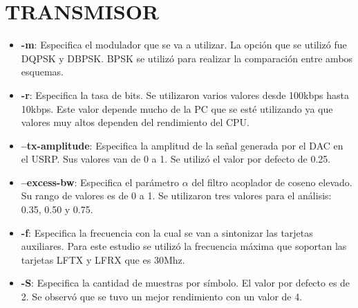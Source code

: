 \section*{TRANSMISOR}
\begin{itemize}
  \item \textbf{-m}: Especifica el modulador que se va a utilizar. La opci\'on que se utiliz\'o fue
  DQPSK y DBPSK. BPSK se utiliz\'o para realizar la comparaci\'on entre ambos esquemas.
  \item \textbf{-r}: Especifica la tasa de bits. Se utilizaron varios valores desde 100kbps hasta
  10kbps. Este valor depende mucho de la PC que se est\'e utilizando ya que valores muy altos
  dependen del rendimiento del CPU.
  \item \textbf{--tx-amplitude}: Especifica la amplitud de la se\~nal generada por el DAC en el
  USRP. Sus valores van de 0 a 1. Se utiliz\'o el valor por defecto de 0.25.
  \item \textbf{--excess-bw}: Especifica el par\'ametro $\alpha$ del filtro acoplador de coseno
  elevado. Su rango de valores es de 0 a 1. Se utilizaron tres valores para el an\'alisis: 0.35,
  0.50 y 0.75.
  \item \textbf{-f}: Especifica la frecuencia con la cual se van a sintonizar las tarjetas
  auxiliares. Para este estudio se utiliz\'o la frecuencia m\'axima que soportan las
  tarjetas LFTX y LFRX que es 30Mhz.
  \item \textbf{-S}: Especifica la cantidad de muestras por s\'imbolo. El valor por defecto es de 2. Se
  observ\'o que se tuvo un mejor rendimiento con un valor de 4.
\end{itemize}

